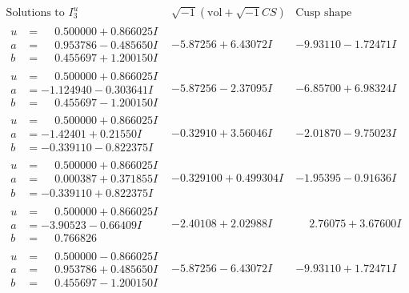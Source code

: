 \documentclass[1p]{elsarticle_modified}
\theoremstyle{definition}
\newcommand{\I}{\sqrt{-1}}
\begin{document}
$$\begin{array}{c|c|c}  
\text{Solutions to }I^u_{3}& \I (\text{vol} + \sqrt{-1}CS) & \text{Cusp shape}\\
 \hline 
\begin{aligned}
u &= \phantom{-}0.500000 + 0.866025 I \\
a &= \phantom{-}0.953786 - 0.485650 I \\
b &= \phantom{-}0.455697 + 1.200150 I\end{aligned}
 & -5.87256 + 6.43072 I & -9.93110 - 1.72471 I \\ \hline\begin{aligned}
u &= \phantom{-}0.500000 + 0.866025 I \\
a &= -1.124940 - 0.303641 I \\
b &= \phantom{-}0.455697 - 1.200150 I\end{aligned}
 & -5.87256 - 2.37095 I & -6.85700 + 6.98324 I \\ \hline\begin{aligned}
u &= \phantom{-}0.500000 + 0.866025 I \\
a &= -1.42401 + 0.21550 I \\
b &= -0.339110 - 0.822375 I\end{aligned}
 & -0.32910 + 3.56046 I & -2.01870 - 9.75023 I \\ \hline\begin{aligned}
u &= \phantom{-}0.500000 + 0.866025 I \\
a &= \phantom{-}0.000387 + 0.371855 I \\
b &= -0.339110 + 0.822375 I\end{aligned}
 & -0.329100 + 0.499304 I & -1.95395 - 0.91636 I \\ \hline\begin{aligned}
u &= \phantom{-}0.500000 + 0.866025 I \\
a &= -3.90523 - 0.66409 I \\
b &= \phantom{-}0.766826\phantom{ +0.000000I}\end{aligned}
 & -2.40108 + 2.02988 I & \phantom{-}2.76075 + 3.67600 I \\ \hline\begin{aligned}
u &= \phantom{-}0.500000 - 0.866025 I \\
a &= \phantom{-}0.953786 + 0.485650 I \\
b &= \phantom{-}0.455697 - 1.200150 I\end{aligned}
 & -5.87256 - 6.43072 I & -9.93110 + 1.72471 I \\ \hline\begin{aligned}

\end{aligned}
\end{array}$$
\end{document}
